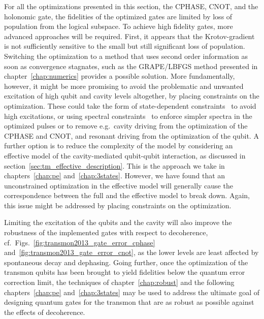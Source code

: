 For all the optimizations presented in this section, the CPHASE, CNOT, and the
holonomic gate, the fidelities of the optimized gates are limited by loss of
population from the logical subspace. To achieve high fidelity gates, more
advanced approaches will be required. First, it appears that the Krotov-gradient
is not sufficiently sensitive to the small but still significant loss of
population. Switching the optimization to a method that uses second order
information as soon as convergence stagnates, such as the GRAPE/LBFGS method
presented in chapter~\ref{chap:numerics} provides a possible solution. More
fundamentally, however, it might be more promising to avoid the problematic and
unwanted excitation of high qubit and cavity levels altogether, by placing
constraints on the optimization. These could take the form of state-dependent
constraints~\cite{PalaoPRA08} to avoid high excitations, or using spectral
constraints~\cite{JosePRA13, ReichJMO2014} to enforce simpler spectra in the
optimized pulses or to remove e.g.\ cavity driving from the optimization of the
CPHASE and CNOT, and resonant driving from the optimization of the qubit.
A further option is to reduce the complexity of the model by considering an
effective model of the cavity-mediated qubit-qubit interaction, as discussed in
section~\ref{sec:tm_effective_description}. This is the approach we take in
chapters~\ref{chap:pe} and~\ref{chap:3states}. However, we have found that an
unconstrained optimization in the effective model will generally cause the
correspondence between the full and the effective model to break down. Again,
this issue might be addressed by placing constraints on the optimization.

Limiting the excitation of the qubits and the cavity will also improve the
robustness of the implemented gates with respect to decoherence,
cf.~Figs.~\ref{fig:transmon2013_gate_error_cphase}
and~\ref{fig:transmon2013_gate_error_cnot}, as the lower levels are least
affected by spontaneous decay and dephasing. Going further,
once the optimization of the transmon qubits has been brought to yield
fidelities below the quantum error correction limit, the techniques of
chapter~\ref{chap:robust} and the following chapters~\ref{chap:pe}
and~\ref{chap:3states} may be used to address the ultimate goal of designing
quantum gates for the transmon that are as robust as possible against the
effects of decoherence.


